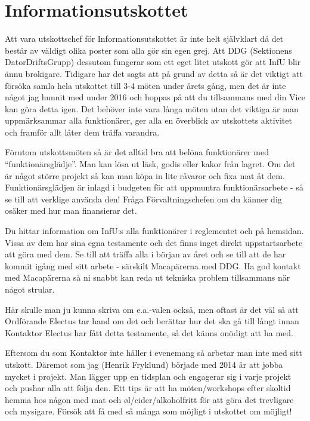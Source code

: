 \documentclass[10pt]{article}
\begin{document}
\section{Informationsutskottet}
Att vara utskottschef för Informationsutskottet är inte helt självklart då det består av väldigt olika poster som alla gör sin egen grej. Att DDG (Sektionens DatorDriftsGrupp) dessutom fungerar som ett eget litet utskott gör att InfU blir ännu brokigare. Tidigare har det sagts att på grund av detta så är det viktigt att försöka samla hela utskottet till 3-4 möten under årets gång, men det är inte något jag hunnit med under 2016 och hoppas på att du tillsammans med din Vice kan göra detta igen. Det behöver inte vara långa möten utan det viktiga är man uppmärksammar alla funktionärer, ger alla en överblick av utskottets aktivitet och framför allt låter dem träffa varandra.

Förutom utskottsmöten så är det alltid bra att belöna funktionärer med ``funktionärsglädje''. Man kan lösa ut läsk, godis eller kakor från lagret. Om det är något större projekt så kan man köpa in lite råvaror och fixa mat åt dem. Funktionärsglädjen är inlagd i budgeten för att uppmuntra funktionärsarbete - så se till att verklige använda den! Fråga Förvaltningschefen om du känner dig osäker med hur man finansierar det.

Du hittar information om InfU:s alla funktionärer i reglementet och på hemsidan. Vissa av dem har sina egna testamente och det finns inget direkt uppstartsarbete att göra med dem. Se till att träffa alla i början av året och se till att de har kommit igång med sitt arbete - särskilt Macapärerna med DDG. Ha god kontakt med Macapärerna så ni snabbt kan reda ut tekniska problem tillsammans när något strular.

Här skulle man ju kunna skriva om e.a.-valen också, men oftast är det väl så att Ordförande Electus tar hand om det och berättar hur det ska gå till långt innan Kontaktor Electus har fått detta testamente, så det känns onödigt att ha med.

Eftersom du som Kontaktor inte håller i evenemang så arbetar man inte med sitt utskott. Däremot som jag (Henrik Fryklund) började med 2014 är att jobba mycket i projekt. Man lägger upp en tidsplan och engagerar sig i varje projekt och pushar alla att följa den. Ett tips är att ha möten/workshops efter skoltid hemma hos någon med mat och \o l/cider/alkoholfritt för att göra det trevligare och mysigare. Försök att få med så många som möjligt i utskottet om möjligt!
\end{document}
